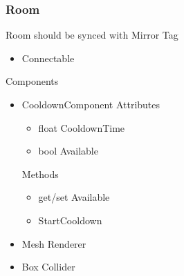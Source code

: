 \documentclass[11pt]{article}
\begin{document}
\subsubsection{Room}
Room should be synced with Mirror
\newline Tag
\begin{itemize}
\item Connectable
\end{itemize}
Components
\begin{itemize}
\item CooldownComponent
\newline Attributes
\begin{itemize}
\item float CooldownTime
\item bool Available
\end{itemize}
Methods
\begin{itemize}
\item get/set Available
\item StartCooldown
\end{itemize}
\item Mesh Renderer
\item Box Collider
\end{itemize}
\end{document}
